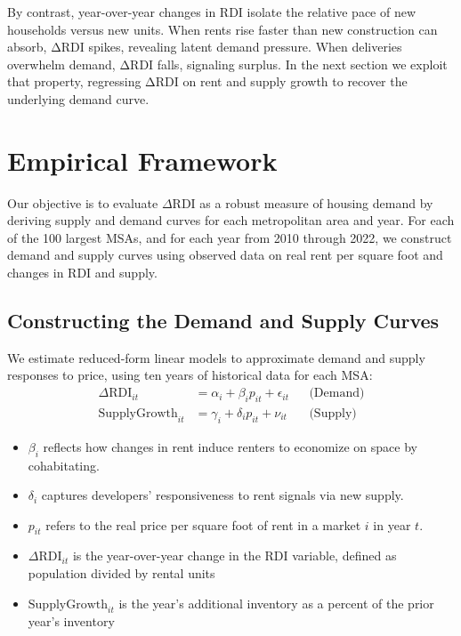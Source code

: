 \documentclass[APA,Times1COL]{WileyNJDv5} %
\begin{document}
By contrast, year-over-year changes in RDI isolate the relative pace of new households versus new units. When rents rise faster than new construction can absorb, ΔRDI spikes, revealing latent demand pressure. When deliveries overwhelm demand, ΔRDI falls, signaling surplus. In the next section we exploit that property, regressing ΔRDI on rent and supply growth to recover the underlying demand curve.

\section{Empirical Framework}
Our objective is to evaluate \( \Delta \text{RDI} \) as a robust measure of housing demand by deriving supply and demand curves for each metropolitan area and year. For each of the 100 largest MSAs, and for each year from 2010 through 2022, we construct demand and supply curves using observed data on real rent per square foot and changes in RDI and supply.

\subsection{Constructing the Demand and Supply Curves}

We estimate reduced-form linear models to approximate demand and supply responses to price, using ten years of historical data for each MSA:
\begin{align*}
	\Delta \text{RDI}_{it} &= \alpha_i + \beta_i p_{it} + \epsilon_{it} && \text{(Demand)} \\
	\text{SupplyGrowth}_{it} &= \gamma_i + \delta_i p_{it} + \nu_{it} && \text{(Supply)}
\end{align*}

\begin{itemize}
	\item \( \beta_i \) reflects how changes in rent induce renters to economize on space by cohabitating.
	\item \( \delta_i \) captures developers' responsiveness to rent signals via new supply.
	\item \( p_{it} \) refers to the real price per square foot of rent in a market \( i \) in year \( t \).
	\item \(\Delta \text{RDI}_{it} \) is the year-over-year change in the RDI variable, defined as population divided by rental units
	\item \(\text{SupplyGrowth}_{it}\) is the year's additional inventory as a percent of the prior year's inventory
\end{itemize}
\end{document}
